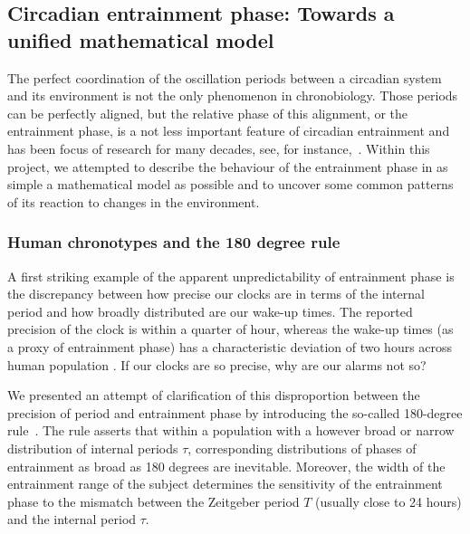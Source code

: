 \subsection{Circadian entrainment phase: Towards a unified mathematical
model}

The perfect coordination of the oscillation periods between a
circadian system and its environment is not the only phenomenon in
chronobiology. Those periods can be perfectly aligned, but the
relative phase of this alignment, or the entrainment phase, is a not
less important feature of circadian entrainment and has been focus of
research for many decades, see, for
instance,~\cite{pittendrigh1981circadian}. Within this project, we
attempted to describe the behaviour of the entrainment phase in as
simple a mathematical model as possible and to uncover some common
patterns of its reaction to changes in the environment.

\subsubsection{Human chronotypes and the 180 degree rule}
A first striking example of the apparent unpredictability of
entrainment phase is the discrepancy between how precise our clocks
are in terms of the internal period and how broadly distributed are
our wake-up times. The reported precision of the clock is within a
quarter of hour, whereas the wake-up times (as a proxy of entrainment
phase) has a characteristic deviation of two hours across human
population \cite{duffy2005entrainment}. If our clocks are so precise,
why are our alarms not so?

We presented an attempt of clarification of this disproportion between
the precision of period and entrainment phase by introducing the
so-called 180-degree rule~\cite{granada2013human}. The rule asserts
that within a population with a however broad or narrow distribution
of internal periods $\tau$, corresponding distributions of phases
of entrainment as broad as 180 degrees are inevitable. Moreover, the
width of the entrainment range of the subject determines the
sensitivity of the entrainment phase to the mismatch between the
Zeitgeber period $T$ (usually close to 24 hours) and the internal
period $\tau$.


